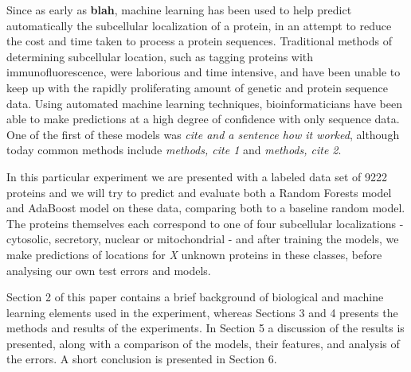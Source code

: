 \documentclass{bioinfo}
\begin{document}
Since as early as \textbf{blah}, machine learning has been used to help predict automatically the subcellular localization of a protein, in an attempt to reduce the cost and time taken to process a protein sequences.  
Traditional methods of determining subcellular location, such as tagging proteins with immunofluorescence, were laborious and time intensive, and have been unable to keep up with the rapidly proliferating amount of genetic and protein sequence data. 
Using automated machine learning techniques, bioinformaticians have been able to make predictions at a high degree of confidence with only sequence data. One of the first of these models was \textit{cite and a sentence how it worked}, although today common methods include \textit{methods, cite 1}  and \textit{methods, cite 2}.



In this particular experiment we are presented with a labeled data set of 9222 proteins and we will try to predict and evaluate both a Random Forests model and AdaBoost model on these data, comparing both to a baseline random model.
The proteins themselves each correspond to one of four subcellular localizations - cytosolic, secretory, nuclear or mitochondrial - and after training the models, we make predictions of locations for \textit{X} unknown proteins in these classes, before analysing our own test errors and models. 

Section 2 of this paper contains a brief background of biological and machine learning elements used in the experiment, whereas Sections 3 and 4 presents the methods and results of the experiments. In Section 5 a discussion of the results is presented, along with a comparison of the models, their features, and analysis of the errors. A short conclusion is presented in Section 6.
\end{document}

